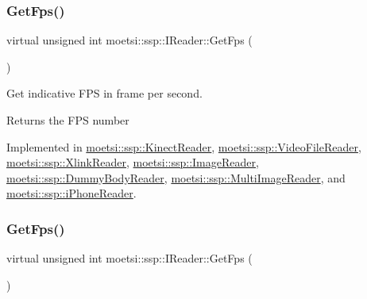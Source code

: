 \subsubsection{\texorpdfstring{Get\+Fps()}{GetFps()}\hspace{0.1cm}{\footnotesize\ttfamily [1/2]}}
{\footnotesize\ttfamily virtual unsigned int moetsi\+::ssp\+::\+I\+Reader\+::\+Get\+Fps (\begin{DoxyParamCaption}{ }\end{DoxyParamCaption})\hspace{0.3cm}{\ttfamily [pure virtual]}}



Get indicative F\+PS in frame per second. 

\begin{DoxyReturn}{Returns}
the F\+PS number 
\end{DoxyReturn}


Implemented in \hyperlink{classmoetsi_1_1ssp_1_1KinectReader_ac88c13693ce8e2e249438ac8de8a7b3c}{moetsi\+::ssp\+::\+Kinect\+Reader}, \hyperlink{classmoetsi_1_1ssp_1_1VideoFileReader_a83359ad82898acdb75240568b182247c}{moetsi\+::ssp\+::\+Video\+File\+Reader}, \hyperlink{classmoetsi_1_1ssp_1_1XlinkReader_accfec6799b561107f27240e5324aa5d4}{moetsi\+::ssp\+::\+Xlink\+Reader}, \hyperlink{classmoetsi_1_1ssp_1_1ImageReader_a86adfec8106c366aaf1ec63e2a7da156}{moetsi\+::ssp\+::\+Image\+Reader}, \hyperlink{classmoetsi_1_1ssp_1_1DummyBodyReader_a7dab48cb8ec247add0c57d98e6cd5fb4}{moetsi\+::ssp\+::\+Dummy\+Body\+Reader}, \hyperlink{classmoetsi_1_1ssp_1_1MultiImageReader_ad0a249af66f8e1a063c3e575fc1b94cb}{moetsi\+::ssp\+::\+Multi\+Image\+Reader}, and \hyperlink{classmoetsi_1_1ssp_1_1iPhoneReader_a4bb216847a6c2ed8eb5d31788a0b8477}{moetsi\+::ssp\+::i\+Phone\+Reader}.

\mbox{\label{classmoetsi_1_1ssp_1_1IReader_a9f6a8650ca290b011b8e5451eeae9f32}} 
\subsubsection{\texorpdfstring{Get\+Fps()}{GetFps()}\hspace{0.1cm}{\footnotesize\ttfamily [2/2]}}
{\footnotesize\ttfamily virtual unsigned int moetsi\+::ssp\+::\+I\+Reader\+::\+Get\+Fps (\begin{DoxyParamCaption}{ }\end{DoxyParamCaption})\hspace{0.3cm}{\ttfamily [pure virtual]}}



